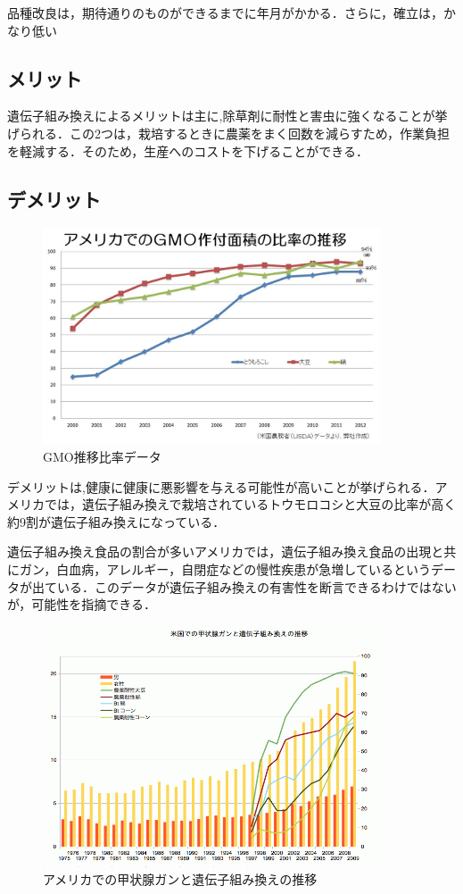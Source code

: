 品種改良は，期待通りのものができるまでに年月がかかる．さらに，確立は，かなり低い\cite{idensi}

\subsection{メリット}
遺伝子組み換えによるメリットは主に,除草剤に耐性と害虫に強くなることが挙げられる．この2つは，栽培するときに農薬をまく回数を減らすため，作業負担を軽減する．そのため，生産へのコストを下げることができる．
\subsection{デメリット}
\begin{figure}[htb]
\centering
\includegraphics[width=10cm]{GMO.jpg}
\caption{GMO推移比率データ}\label{図}
\end{figure}

デメリットは,健康に健康に悪影響を与える可能性が高いことが挙げられる．アメリカでは，遺伝子組み換えで栽培されているトウモロコシと大豆の比率が高く約9割が遺伝子組み換えになっている．\cite{akikawai}

遺伝子組み換え食品の割合が多いアメリカでは，遺伝子組み換え食品の出現と共にガン，白血病，アレルギー，自閉症などの慢性疾患が急増しているというデータが出ている．このデータが遺伝子組み換えの有害性を断言できるわけではないが，可能性を指摘できる．\cite{mondsi}
\begin{figure}[htb]
\centering
\includegraphics[width=10cm]{gan.png}
\caption{アメリカでの甲状腺ガンと遺伝子組み換えの推移}\label{図}
\end{figure}


